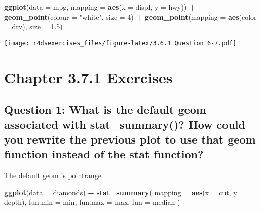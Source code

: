 \documentclass[
]{book}
\newenvironment{Shaded}{\begin{snugshade}}{\end{snugshade}}
\newcommand{\DataTypeTok}[1]{\textcolor[rgb]{0.13,0.29,0.53}{#1}}
\newcommand{\DecValTok}[1]{\textcolor[rgb]{0.00,0.00,0.81}{#1}}
\newcommand{\FloatTok}[1]{\textcolor[rgb]{0.00,0.00,0.81}{#1}}
\newcommand{\KeywordTok}[1]{\textcolor[rgb]{0.13,0.29,0.53}{\textbf{#1}}}
\newcommand{\NormalTok}[1]{#1}
\newcommand{\OperatorTok}[1]{\textcolor[rgb]{0.81,0.36,0.00}{\textbf{#1}}}
\newcommand{\StringTok}[1]{\textcolor[rgb]{0.31,0.60,0.02}{#1}}
\begin{document}
\begin{Shaded}
\begin{Highlighting}[]
\KeywordTok{ggplot}\NormalTok{(}\DataTypeTok{data =}\NormalTok{ mpg, }\DataTypeTok{mapping =} \KeywordTok{aes}\NormalTok{(}\DataTypeTok{x =}\NormalTok{ displ, }\DataTypeTok{y =}\NormalTok{ hwy)) }\OperatorTok{+}
\StringTok{  }\KeywordTok{geom_point}\NormalTok{(}\DataTypeTok{colour =} \StringTok{"white"}\NormalTok{, }\DataTypeTok{size =} \DecValTok{4}\NormalTok{) }\OperatorTok{+}
\StringTok{  }\KeywordTok{geom_point}\NormalTok{(}\DataTypeTok{mapping =} \KeywordTok{aes}\NormalTok{(}\DataTypeTok{color =}\NormalTok{ drv), }\DataTypeTok{size =} \FloatTok{1.5}\NormalTok{)}
\end{Highlighting}
\end{Shaded}

\texttt{[image: r4dsexercises\_files/figure-latex/3.6.1 Question 6-7.pdf]}

\hypertarget{chapter-3.7.1-exercises}{%
\section{Chapter 3.7.1 Exercises}\label{chapter-3.7.1-exercises}}

\hypertarget{question-1-what-is-the-default-geom-associated-with-stat_summary-how-could-you-rewrite-the-previous-plot-to-use-that-geom-function-instead-of-the-stat-function}{%
\subsection{Question 1: What is the default geom associated with stat\_summary()? How could you rewrite the previous plot to use that geom function instead of the stat function?}\label{question-1-what-is-the-default-geom-associated-with-stat_summary-how-could-you-rewrite-the-previous-plot-to-use-that-geom-function-instead-of-the-stat-function}}

The default geom is pointrange.

\begin{Shaded}
\begin{Highlighting}[]
\KeywordTok{ggplot}\NormalTok{(}\DataTypeTok{data =}\NormalTok{ diamonds) }\OperatorTok{+}\StringTok{ }
\StringTok{  }\KeywordTok{stat_summary}\NormalTok{(}
    \DataTypeTok{mapping =} \KeywordTok{aes}\NormalTok{(}\DataTypeTok{x =}\NormalTok{ cut, }\DataTypeTok{y =}\NormalTok{ depth),}
    \DataTypeTok{fun.min =}\NormalTok{ min,}
    \DataTypeTok{fun.max =}\NormalTok{ max,}
    \DataTypeTok{fun =}\NormalTok{ median}
\NormalTok{  )}
\end{Highlighting}
\end{Shaded}
\end{document}

